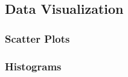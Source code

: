 \subsection{Data Visualization}

\subsubsection{Scatter Plots}

\subsubsection{Histograms}





\begin{comment}

- Maybe rename file to Rand_Statistics.tex

-descriptive vs inductive statistics
 descriptive: describes data that is available
 inductive: draws conclusions from sampled data about a general population



The 7 Levels of Statistics
https://www.youtube.com/watch?v=eg6N0i8NVxs


Degrees of Freedom, Actually Explained - The Geometry of Statistics | Ch. 1 (#SoME4)
https://www.youtube.com/watch?v=VDlnuO96p58


\end{comment}